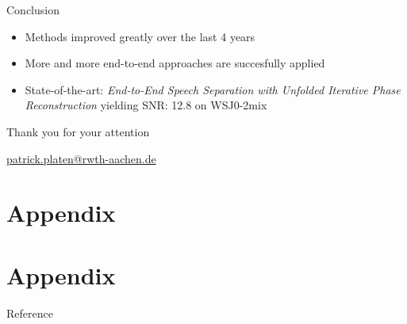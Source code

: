 \documentclass[xcolor=table,mathserif,9pt]{beamer}    %
\newcommand{\backupbegin}{
   \newcounter{finalframe}
   \setcounter{finalframe}{\value{framenumber}}
}
\newcommand{\backupend}{
   \setcounter{framenumber}{\value{finalframe}}
}
\newcommand{\stoptocwriting}{%
  \addtocontents{toc}{\protect\setcounter{tocdepth}{-5}}}
\newcommand{\resumetocwriting}{%
  \addtocontents{toc}{\protect\setcounter{tocdepth}{2}}}
\begin{document}
\begin{frame}{Conclusion}

\begin{itemize}
	\item Methods improved greatly over the last 4 years
	\item More and more end-to-end approaches are succesfully applied 
	\item State-of-the-art: \emph{End-to-End Speech Separation with Unfolded Iterative Phase Reconstruction} yielding SNR: 12.8 on WSJ0-2mix \cite{2018arXiv180410204W}
\end{itemize}

\end{frame}


\begin{frame}[label=finalSlide]
  \label{LastPage}%
  \begin{center}
    \vfill
    {\Large
    \textcolor{i6bluedark}{Thank you for your attention}
    }
    \vfill
    {\insertauthor}

    \vspace{10mm}
    \url{patrick.platen@rwth-aachen.de}
  \end{center}
\end{frame}

\nocite{*}

\stoptocwriting
\section{Appendix}
\resumetocwriting



\section*{Appendix}




\begin{frame}[allowframebreaks]
  \centerline{Reference}
 
 
\end{frame}

\end{document}
